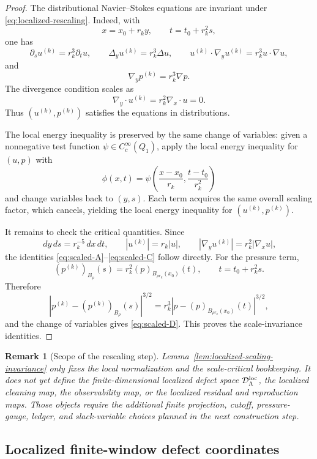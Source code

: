 \documentclass[11pt]{article}
\numberwithin{equation}{section}
\newtheorem{remark}[theorem]{Remark}
\newcommand{\dd}{\,d}
\begin{document}
\begin{proof}
The distributional Navier--Stokes equations are invariant under
\eqref{eq:localized-rescaling}.  Indeed, with
\[
        x=x_0+r_ky,\qquad t=t_0+r_k^2s,
\]
one has
\[
        \partial_s u^{(k)}=r_k^3\partial_tu,\qquad
        \Delta_yu^{(k)}=r_k^3\Delta u,\qquad
        u^{(k)}\cdot\nabla_yu^{(k)}
        =r_k^3u\cdot\nabla u,
\]
and
\[
        \nabla_yp^{(k)}=r_k^3\nabla p.
\]
The divergence condition scales as
\[
        \nabla_y\cdot u^{(k)}=r_k^2\nabla_x\cdot u=0.
\]
Thus \((u^{(k)},p^{(k)})\) satisfies the equations in distributions.

The local energy inequality is preserved by the same change of variables:
given a nonnegative test function \(\psi\in C_c^\infty(Q_1)\), apply the
local energy inequality for \((u,p)\) with
\[
        \phi(x,t)
        =
        \psi\left(\frac{x-x_0}{r_k},\frac{t-t_0}{r_k^2}\right)
\]
and change variables back to \((y,s)\).  Each term acquires the same
overall scaling factor, which cancels, yielding the local energy
inequality for \((u^{(k)},p^{(k)})\).

It remains to check the critical quantities.  Since
\[
        \dd y\dd s=r_k^{-5}\dd x\dd t,\qquad
        |u^{(k)}|=r_k|u|,\qquad
        |\nabla_yu^{(k)}|=r_k^2|\nabla_xu|,
\]
the identities \eqref{eq:scaled-A}--\eqref{eq:scaled-C} follow directly.
For the pressure term,
\[
        (p^{(k)})_{B_\rho}(s)
        =
        r_k^2(p)_{B_{\rho r_k}(x_0)}(t),
        \qquad t=t_0+r_k^2s.
\]
Therefore
\[
        \left|
        p^{(k)}-(p^{(k)})_{B_\rho}(s)
        \right|^{3/2}
        =
        r_k^3
        \left|
        p-(p)_{B_{\rho r_k}(x_0)}(t)
        \right|^{3/2},
\]
and the change of variables gives \eqref{eq:scaled-D}.  This proves the
scale-invariance identities.
\end{proof}

\begin{remark}[Scope of the rescaling step]
Lemma~\ref{lem:localized-scaling-invariance} only fixes the local
normalization and the scale-critical bookkeeping.  It does not yet define
the finite-dimensional localized defect space
\(\mathcal D_\Lambda^{\rm loc}\), the localized cleaning map, the
observability map, or the localized residual and reproduction maps.  Those
objects require the additional finite projection, cutoff, pressure-gauge,
ledger, and slack-variable choices planned in the next construction step.
\end{remark}

\subsection{Localized finite-window defect coordinates}\label{subsec:localized-defect-coordinates}
\end{document}
